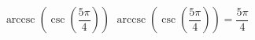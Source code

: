  {$\operatorname{arccsc}\left(\csc\left(\dfrac{5\pi}{4}\right) \right)$}
{ $\operatorname{arccsc}\left(\csc\left(\dfrac{5\pi}{4}\right) \right) = \dfrac{5\pi}{4}$}
